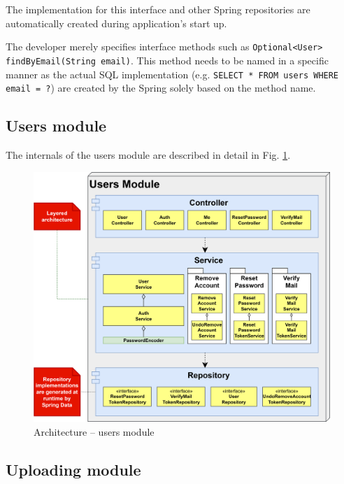 \documentclass[a4paper,twoside,12pt]{book}
\begin{document}
The implementation for this interface and other Spring repositories are automatically created during application's start up.

The developer merely specifies interface methods such as \texttt{Optional<User> findByEmail(String email)}. 
This method needs to be named in a specific manner \cite{bib:spring_in_action} as the actual SQL implementation (e.g. \texttt{SELECT * FROM users WHERE email = ?}) are created by the Spring
solely based on the method name.


\subsection{Users module}

The internals of the users module are described in detail in Fig. \ref{fig:architecture_users}.


\begin{figure}
  \centering
  \includegraphics[width=\linewidth]{img/architecture_users.png}
  \caption{Architecture – users module}
  \label{fig:architecture_users}
\end{figure}

\subsection{Uploading module}
\end{document}
